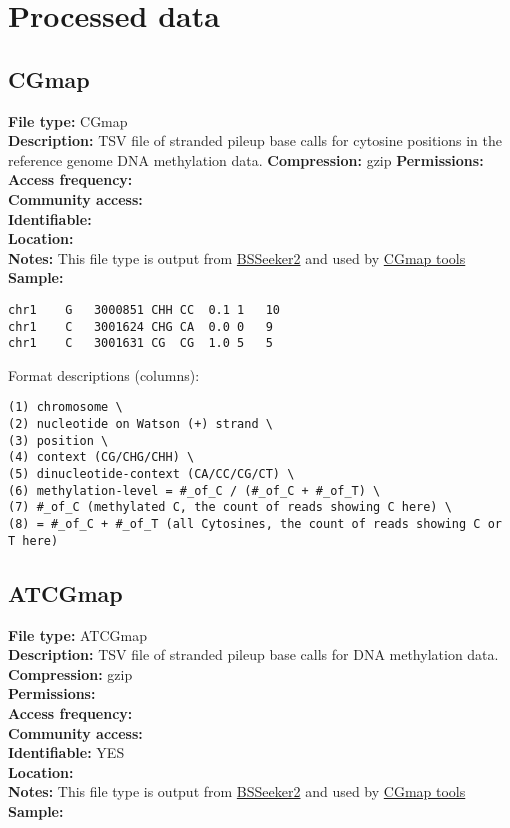 \documentclass[
]{book}
\begin{document}
\hypertarget{processed-data}{%
\section{Processed data}\label{processed-data}}

\hypertarget{cgmap}{%
\subsection{CGmap}\label{cgmap}}

\textbf{File type:} CGmap\\
\textbf{Description:} TSV file of stranded pileup base calls for cytosine positions in the reference genome DNA methylation data.
\textbf{Compression:} gzip
\textbf{Permissions:}\\
\textbf{Access frequency:}\\
\textbf{Community access:}\\
\textbf{Identifiable:}\\
\textbf{Location:}\\
\textbf{Notes:} This file type is output from \href{https://github.com/BSSeeker/BSseeker2}{BSSeeker2} and used by \href{https://cgmaptools.github.io/}{CGmap tools}\\
\textbf{Sample:}

\begin{verbatim}
chr1    G   3000851 CHH CC  0.1 1   10
chr1    C   3001624 CHG CA  0.0 0   9
chr1    C   3001631 CG  CG  1.0 5   5
\end{verbatim}

Format descriptions (columns):

\begin{verbatim}
(1) chromosome \
(2) nucleotide on Watson (+) strand \
(3) position \
(4) context (CG/CHG/CHH) \
(5) dinucleotide-context (CA/CC/CG/CT) \
(6) methylation-level = #_of_C / (#_of_C + #_of_T) \
(7) #_of_C (methylated C, the count of reads showing C here) \
(8) = #_of_C + #_of_T (all Cytosines, the count of reads showing C or T here)
\end{verbatim}

\hypertarget{atcgmap}{%
\subsection{ATCGmap}\label{atcgmap}}

\textbf{File type:} ATCGmap\\
\textbf{Description:} TSV file of stranded pileup base calls for DNA methylation data.\\
\textbf{Compression:} gzip\\
\textbf{Permissions:}\\
\textbf{Access frequency:}\\
\textbf{Community access:}\\
\textbf{Identifiable:} YES\\
\textbf{Location:}\\
\textbf{Notes:} This file type is output from \href{https://github.com/BSSeeker/BSseeker2}{BSSeeker2} and used by \href{https://cgmaptools.github.io/}{CGmap tools}\\
\textbf{Sample:}
\end{document}

